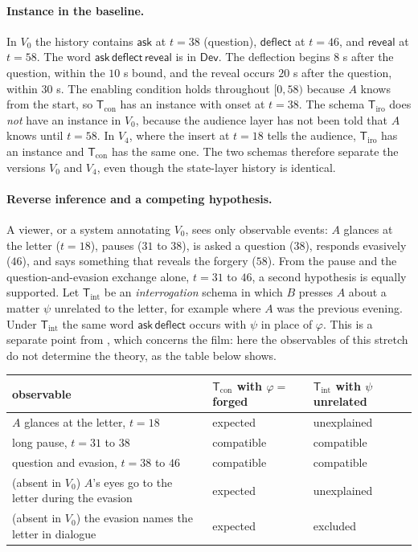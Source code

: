 \paragraph{Instance in the baseline.} In $V_0$ the history contains $\mathsf{ask}$ at $t=38$ (question), $\mathsf{deflect}$ at $t=46$, and $\mathsf{reveal}$ at $t=58$. The word $\mathsf{ask}\,\mathsf{deflect}\,\mathsf{reveal}$ is in $\mathsf{Dev}$. The deflection begins $8$ s after the question, within the $10$ s bound, and the reveal occurs $20$ s after the question, within $30$ s. The enabling condition holds throughout $[0,58)$ because $A$ knows from the start, so $\mathsf{T}_{\mathrm{con}}$ has an instance with onset at $t=38$. The schema $\mathsf{T}_{\mathrm{iro}}$ does \emph{not} have an instance in $V_0$, because the audience layer has not been told that $A$ knows until $t=58$. In $V_4$, where the insert at $t=18$ tells the audience, $\mathsf{T}_{\mathrm{iro}}$ has an instance and $\mathsf{T}_{\mathrm{con}}$ has the same one. The two schemas therefore separate the versions $V_0$ and $V_4$, even though the state-layer history is identical.

\paragraph{Reverse inference and a competing hypothesis.} A viewer, or a system annotating $V_0$, sees only observable events: $A$ glances at the letter ($t=18$), pauses ($31$ to $38$), is asked a question ($38$), responds evasively ($46$), and says something that reveals the forgery ($58$). From the pause and the question-and-evasion exchange alone, $t=31$ to $46$, a second hypothesis is equally supported. Let $\mathsf{T}_{\mathrm{int}}$ be an \emph{interrogation} schema in which $B$ presses $A$ about a matter $\psi$ unrelated to the letter, for example where $A$ was the previous evening. Under $\mathsf{T}_{\mathrm{int}}$ the same word $\mathsf{ask}\,\mathsf{deflect}$ occurs with $\psi$ in place of $\varphi$. This is a separate point from , which concerns the film: here the observables of this stretch do not determine the theory, as the table below shows.

\begin{center}
\small
\begin{tabular}{p{5.8cm}p{3cm}p{3cm}}
\toprule
observable & $\mathsf{T}_{\mathrm{con}}$ with $\varphi=$ forged & $\mathsf{T}_{\mathrm{int}}$ with $\psi$ unrelated\\
\midrule
$A$ glances at the letter, $t=18$ & expected & unexplained\\
long pause, $t=31$ to $38$ & compatible & compatible\\
question and evasion, $t=38$ to $46$ & compatible & compatible\\
(absent in $V_0$) $A$'s eyes go to the letter during the evasion & expected & unexplained\\
(absent in $V_0$) the evasion names the letter in dialogue & expected & excluded\\
\bottomrule
\end{tabular}
\end{center}


